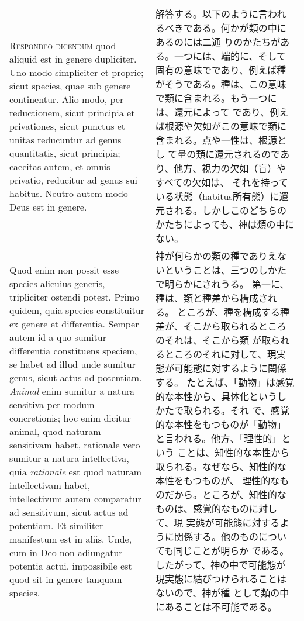 \documentclass[10pt]{jsarticle}
\begin{document}
\begin{longtable}{p{21em}p{21em}}
{\scshape Respondeo dicendum} quod aliquid est in genere dupliciter.
Uno modo simpliciter et proprie; sicut species, quae sub genere
continentur.  Alio modo, per reductionem, sicut principia et
privationes, sicut punctus et unitas reducuntur ad genus quantitatis,
sicut principia; caecitas autem, et omnis privatio, reducitur ad genus
sui habitus.  Neutro autem modo Deus est in genere.

&


解答する。以下のように言われるべきである。何かが類の中にあるのには二通
りのかたちがある。一つには、端的に、そして固有の意味でであり、例えば種
がそうである。種は、この意味で類に含まれる。もう一つには、還元によって
であり、例えば根源や欠如がこの意味で類に含まれる。点や一性は、根源とし
て量の類に還元されるのであり、他方、視力の欠如（盲）やすべての欠如は、
それを持っている状態（habitus所有態）に還元される。しかしこのどちらの
かたちによっても、神は類の中にない。

\\


Quod enim non possit esse species alicuius generis, tripliciter
ostendi potest.  Primo quidem, quia species constituitur ex genere et
differentia.  Semper autem id a quo sumitur differentia constituens
speciem, se habet ad illud unde sumitur genus, sicut actus ad
potentiam.  {\itshape Animal} enim sumitur a natura sensitiva per
modum concretionis; hoc enim dicitur animal, quod naturam sensitivam
habet, rationale vero sumitur a natura intellectiva, quia {\itshape
rationale} est quod naturam intellectivam habet, intellectivum autem
comparatur ad sensitivum, sicut actus ad potentiam. Et similiter
manifestum est in aliis.  Unde, cum in Deo non adiungatur potentia
actui, impossibile est quod sit in genere tanquam species.

&
神が何らかの類の種でありえないということは、三つのしかたで明らかにされうる。
第一に、種は、類と種差から構成される。
ところが、種を構成する種差が、そこから取られるところのそれは、そこから類
 が取られるところのそれに対して、現実態が可能態に対するように関係する。
たとえば、「動物」は感覚的な本性から、具体化というしかたで取られる。それ
 で、感覚的な本性をもつものが「動物」と言われる。他方、「理性的」という
 ことは、知性的な本性から取られる。なぜなら、知性的な本性をもつものが、
 理性的なものだから。ところが、知性的なものは、感覚的なものに対して、現
 実態が可能態に対するように関係する。他のものについても同じことが明らか
 である。
したがって、神の中で可能態が現実態に結びつけられることはないので、神が種
 として類の中にあることは不可能である。


\end{longtable}
\end{document}
